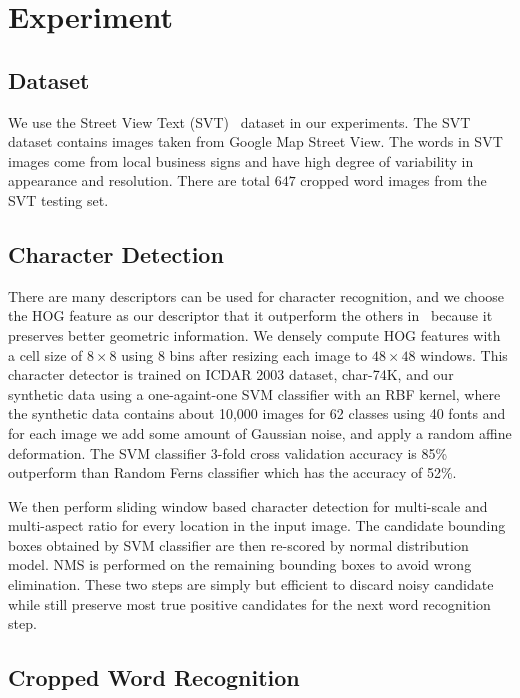 \documentclass[10pt,twocolumn,letterpaper]{article}
\begin{document}
\section{Experiment}
\subsection{Dataset}

We use the Street View Text (SVT)~\cite{417} dataset in our experiments. The SVT dataset contains images taken from Google Map Street View. The words in SVT images come from local business signs and have high degree of variability in appearance and resolution. There are total $647$ cropped word images from the SVT testing set.

\subsection{Character Detection}

There are many descriptors can be used for character recognition, and we choose the HOG feature as our descriptor that it outperform the others in~\cite{117} because it preserves better geometric information. We densely compute HOG features with a cell size of $8 \times 8$ using $8$ bins after resizing each image to $48 \times 48$ windows. This character detector is trained on ICDAR 2003 dataset, char-74K, and our synthetic data using a one-againt-one SVM classifier with an RBF kernel, where the synthetic data contains about 10,000 images for 62 classes using 40 fonts and for each image we add some amount of Gaussian noise, and apply a random affine deformation. The SVM classifier 3-fold cross validation accuracy is 85\% outperform than Random Ferns classifier which has the accuracy of 52\%.

We then perform sliding window based character detection for multi-scale and multi-aspect ratio for every location in the input image. The candidate bounding boxes obtained by SVM classifier are then re-scored by normal distribution model. NMS is performed on the remaining bounding boxes to avoid wrong elimination. These two steps are simply but efficient to discard noisy candidate while still preserve most true positive candidates for the next word recognition step.

\subsection{Cropped Word Recognition}
\end{document}

